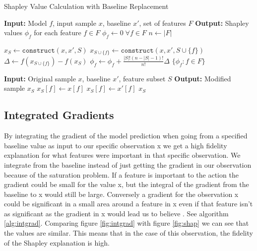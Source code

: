 \documentclass[UKenglish]{uiomasterthesis}
\begin{document}
\begin{algorithm}
\caption{Shapley Value Calculation with Baseline Replacement}
\label{alg:shapley}
\begin{algorithmic}
    \State \textbf{Input:} Model $f$, input sample $x$, baseline $x'$, set of features $F$
    \State \textbf{Output:} Shapley values $\phi_f$ for each feature $f \in F$
    \State $\phi_f \gets 0 \; \forall f \in F$ 
    \State $n \gets |F|$ 
    
            \State $x_S \gets \texttt{construct}(x, x', S)$ 
            \State $x_{S \cup \{f\}} \gets \texttt{construct}(x, x', S \cup \{f\})$
            \State $\Delta \gets f(x_{S \cup \{f\}}) - f(x_S)$ 
            \State $\phi_f \gets \phi_f + \frac{|S|!(n - |S| - 1)!}{n!} \Delta$
        \EndFor
    \EndFor
    \State \Return $\{\phi_f : f \in F\}$
    
        \State \textbf{Input:} Original sample $x$, baseline $x'$, feature subset $S$
        \State \textbf{Output:} Modified sample $x_S$
                \State $x_S[f] \gets x[f]$
            \Else
                \State $x_S[f] \gets x'[f]$ 
            \EndIf
        \EndFor
        \State \Return $x_S$
    \EndFunction
\end{algorithmic}
\end{algorithm}

\subsection{Integrated Gradients}
\label{sec:intgrad}
By integrating the gradient of the model prediction when going from a specified baseline value as input to our specific observation x we get a high fidelity explanation for what features were important in that specific observation. We integrate from the baseline instead of just getting the gradient in our observation because of the saturation problem. If a feature is important to the action the gradient could be small for the value x, but the integral of the gradient from the baseline to x would still be large. Conversely a gradient for the observation x could be significant in a small area around a feature in x even if that feature isn't as significant as the gradient in x would lead us to believe \cite{sundararajan2017axiomaticattributiondeepnetworks}. See algorithm \ref{alg:intgrad}. Comparing figure \ref{fig:intgrad} with figure \ref{fig:shap} we can see that the values are similar. This means that in the case of this observation, the fidelity of the Shapley explanation is high.
\end{document}
